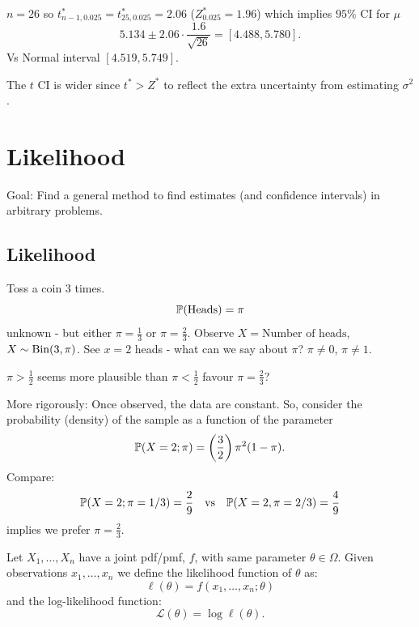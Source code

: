 \documentclass[10pt, a4paper]{article}
\begin{document}
\begin{example}
    $n = 26$ so $t_{n - 1, 0.025}^{*} = t_{25, 0.025}^{*} = 2.06$
    ($Z_{0.025}^{*} = 1.96$)
    which implies $95\%$ CI for $\mu$
    \[
    5.134 \pm 2.06 \cdot \frac{1.6}{\sqrt{26}} = [4.488, 5.780].
    \]
    Vs Normal interval $[4.519, 5.749]$.

    The $t$ CI is wider since $t ^ {*} > Z ^ {*}$ to reflect the extra uncertainty from estimating $\sigma ^ 2$.
\end{example}

\newpage

\section{Likelihood}
Goal:
Find a general method to find estimates
(and confidence intervals)
in arbitrary problems.

\subsection{Likelihood}
\begin{example}
    Toss a coin $3$ times.
    \[
    \P(\text{Heads}) = \pi
    \]
    unknown -
    but either $\pi = \frac{1}{3}$ or $\pi = \frac{2}{3}$.
    Observe $X = \text{Number of heads}$,
    $X \sim \Bin(3, \pi)$.
    See $x = 2$ heads -
    what can we say about $\pi$?
    $\pi \neq 0$,
    $\pi \neq 1$.

    $\pi > \frac{1}{2}$ seems more plausible than $\pi < \frac{1}{2}$ favour $\pi = \frac{2}{3}$?

    More rigorously:
    Once observed,
    the data are constant.
    So,
    consider the probability
    (density)
    of the sample as a function of the parameter
    \[
    \P(X = 2; \pi) = \left(\frac{3}{2}\right)\pi ^ 2(1 - \pi).
    \]
    Compare:
    \[
    \P(X = 2; \pi = 1 / 3) = \frac{2}{9}\quad\text{vs}\quad\P(X = 2, \pi = 2 / 3) = \frac{4}{9}
    \]
    implies we prefer $\pi = \frac{2}{3}$.
\end{example}

\begin{definition}
    Let $X_1, \dotsc, X_n$ have a joint pdf/pmf,
    $f$,
    with same parameter $\theta \in \Omega$.
    Given observations $x_1, \dotsc, x_n$ we define the likelihood function of $\theta$ as:
    \[
    \ell(\theta) = f(x_1, \dotsc, x_n; \theta)
    \]
    and the log-likelihood function:
    \[
    \mathcal{L}(\theta) = \log{\ell(\theta)}.
    \]
\end{definition}
\end{document}
